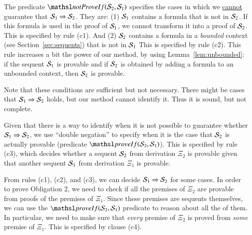 \documentclass{new_tlp}
\newcommand{\provIf}[2]{\ensuremath{\tsl{proveIf}(\ensuremath{#1},\ensuremath{#2})}}
\newcommand{\notProvIf}[2]{\ensuremath{\tsl{notProveIf}(\ensuremath{#1},\ensuremath{#2})}}
\begin{document}
The predicate $\notProvIf{\Sscr_2}{\Sscr_1}$ specifies the cases in which we
\underline{cannot} guarantee that $\Sscr_1 \Rightarrow \Sscr_2$.
They are: (1) $\Sscr_1$ contains a formula that is not in $\Sscr_2$. If this
formula is used in the proof of $\Sscr_1$, we cannot transform it into a proof
of $\Sscr_2$. This is specified by rule (c1). And (2) $\Sscr_2$ contains a
formula in a \emph{bounded} context (see Section~\ref{sec:sequents}) that is not in $\Sscr_1$
This is specified by rule (c2). This rule increases a bit the power of our
method, by using Lemma~\ref{lem:unbounded}:
if the sequent $\Sscr_1$ is provable and if $\Sscr_2$ is obtained
by adding a formula to an unbounded context, 
then $\Sscr_2$ is provable. 

Note that these conditions are sufficient but not necessary. There might be
cases that $\Sscr_1 \Rightarrow \Sscr_2$ holds, but our method cannot
identify it. Thus it is sound, but not complete.

Given that there is a way to identify when it is not possible to guarantee whether 
$\Sscr_1 \Rightarrow \Sscr_2$, we use ``double negation'' to specify
when it is the case that $\Sscr_2$ is actually provable (predicate
$\provIf{\Sscr_2}{\Sscr_1}$). This is specified by rule (c3), which decides
whether a sequent $\Sscr_2$ from derivation $\Xi_2$ is provable given that another
sequent $\Sscr_1$ from derivation $\Xi_1$ is provable.

From rules (c1), (c2), and (c3),  we can decide $\Sscr_1 \Rightarrow \Sscr_2$
for some cases. In order to prove
Obligation 2, we need to check if all the premises of $\Xi_2$ are provable from
proofs of the premises of $\Xi_1$. Since these premises are sequents
themselves, we can use the $\provIf{\Sscr_2}{\Sscr_1}$ predicate to reason
about all the of them. In particular, we need to make sure that \emph{every} premise of
$\Xi_2$ is proved from \emph{some} premise of $\Xi_1$. This is specified by clause
(c4).
\end{document}

